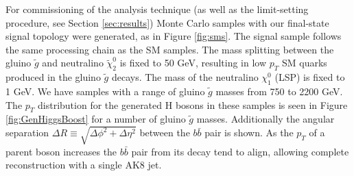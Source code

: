 For commissioning of the analysis technique (as well as the limit-setting procedure, see Section \ref{sec:results}) Monte Carlo samples with our final-state signal topology were generated, as in Figure \ref{fig:sms}. The signal sample follows the same processing chain as the SM samples. The mass splitting between the gluino $\tilde{g}$ and neutralino $\tilde{\chi}_{2}^{0}$ is fixed to 50 GeV, resulting in low $p_{T}$ SM quarks produced in the gluino $\tilde{g}$ decays. The mass of the neutralino $\chi^{0}_{1}$ (LSP) is fixed to 1 GeV. We have samples with a range of gluino $\tilde{g}$ masses from 750 to 2200 GeV. The $p_{T}$ distribution for the generated H bosons in these samples is seen in Figure \ref{fig:GenHiggsBoost} for a number of gluino $\tilde{g}$ masses. Additionally the angular separation $\Delta R \equiv \sqrt{\Delta\phi^{2}+\Delta\eta^{2}}$ between the $b\bar{b}$ pair is shown. As the $p_{T}$ of a parent boson increases the $b\bar{b}$ pair from its decay tend to align, allowing complete reconstruction with a single AK8 jet.

